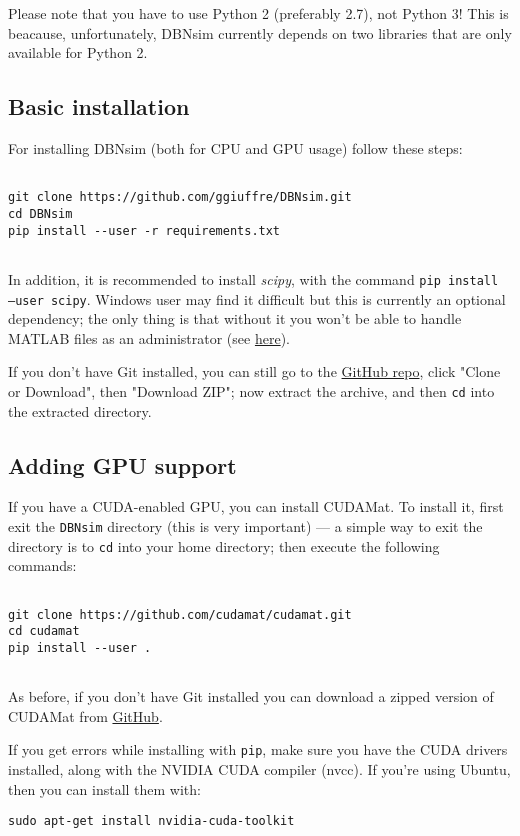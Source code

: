 \documentclass[a4paper]{article}
\begin{document}
		
Please note that you have to use Python 2 (preferably 2.7), not Python 3! This is beacause, unfortunately, DBNsim currently depends on two libraries that are only available for Python 2.

		
	\subsection{Basic installation}

		
For installing DBNsim (both for CPU and GPU usage) follow these steps:
		\begin{verbatim}

git clone https://github.com/ggiuffre/DBNsim.git
cd DBNsim
pip install --user -r requirements.txt
		
\end{verbatim}

		
In addition, it is recommended to install \emph{scipy}, with the command \texttt{pip install --user scipy}. Windows user may find it difficult but this is currently an optional dependency; the only thing is that without it you won't be able to handle MATLAB files as an administrator (see \href{05_admin.html}{here}).
		
If you don't have Git installed, you can still go to the \href{https://github.com/ggiuffre/DBNsim}{GitHub repo}, click "Clone or Download", then "Download ZIP"; now extract the archive, and then \texttt{cd} into the extracted directory.

		
	\subsection{Adding GPU support}

		
If you have a CUDA-enabled GPU, you can install CUDAMat. To install it, first exit the \texttt{DBNsim} directory (this is very important) --- a simple way to exit the directory is to \texttt{cd} into your home directory; then execute the following commands:
		\begin{verbatim}

git clone https://github.com/cudamat/cudamat.git
cd cudamat
pip install --user .
		
\end{verbatim}

		
As before, if you don't have Git installed you can download a zipped version of CUDAMat from \href{https://github.com/cudamat/cudamat}{GitHub}.
		
If you get errors while installing with \texttt{pip}, make sure you have the CUDA drivers installed, along with the NVIDIA CUDA compiler (nvcc). If you're using Ubuntu, then you can install them with:
		\begin{verbatim}
sudo apt-get install nvidia-cuda-toolkit
\end{verbatim}
\end{document}

